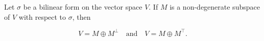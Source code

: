 Let $\sigma$ be a bilinear form on the vector space $V$. If $M$ is a non-degenerate subspace of $V$ with respect to $\sigma$, then

$$V = M \oplus M^{\perp} \quad \text{and} \quad V = M \oplus M^{\top}.$$
